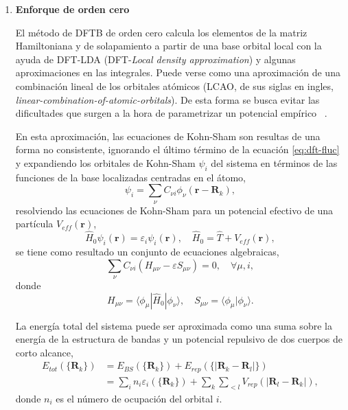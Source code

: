 \begin{enumerate}
    \item \textbf{Enforque de orden cero}

        El método de DFTB de orden cero calcula los elementos de la matriz 
        Hamiltoniana y de solapamiento a partir de una base orbital local con la
        ayuda de DFT-LDA (DFT-\textit{Local density approximation}) y algunas
        aproximaciones en las integrales. Puede verse como una aproximación de 
        una combinación lineal de los orbitales atómicos (LCAO, de sus siglas en 
        ingles, \textit{linear-combination-of-atomic-orbitals}). De esta forma se
        busca evitar las dificultades que surgen a la hora de parametrizar un 
        potencial empírico ~\cite{dftb1, dftb2}.

        En esta aproximación, las ecuaciones de Kohn-Sham son resultas de una
        forma no consistente, ignorando el último término de la ecuación 
        \ref{eq:dft-fluc} y expandiendo los orbitales de Kohn-Sham $\psi_i$ del 
        sistema en términos de las funciones de la base localizadas centradas en 
        el átomo,
        $$
        \psi_i = \sum_{\nu} C_{\nu i} \phi_{\nu}(\mathbf{r}-\mathbf{R}_k),
        $$
        resolviendo las ecuaciones de Kohn-Sham para un potencial efectivo de una
        partícula $V_{eff}(\mathbf{r})$,
        \begin{equation}\label{eq:kohn-sham-mod}
            \hat{H}_0 \psi_i(\mathbf{r}) = \varepsilon_i \psi_i(\mathbf{r}), \quad \hat{H}_0 = \hat{T} + V_{eff}(\mathbf{r}),
        \end{equation}
        se tiene como resultado un conjunto de ecuaciones algebraicas,
        \begin{equation}\label{eq:alg-eq}
        \sum_{\nu} C_{\nu i} (H_{\mu \nu} - \varepsilon S_{\mu \nu}) = 0, \quad \forall \mu, i,
        \end{equation}
        donde
        $$
        H_{\mu \nu} = \langle \phi_{\mu}|\hat{H}_0|\phi_{\nu} \rangle, \quad S_{\mu \nu} = \langle\phi_{\mu}|\phi_{\nu}\rangle.
        $$

        La energía total del sistema puede ser aproximada como una suma sobre la
        energía de la estructura de bandas y un potencial repulsivo de dos cuerpos
        de corto alcance,
        \begin{equation*}
            \begin{aligned}
                   E_{tot}(\{\mathbf{R}_k\}) &= E_{BS}(\{\mathbf{R}_k\}) + E_{rep}(\{|\mathbf{R}_k - \mathbf{R}_l|\}) \\
                    &= \sum_i n_i \varepsilon_i(\{\mathbf{R}_k\}) + \sum_k \sum_{<l} V_{rep}(|\mathbf{R}_l - \mathbf{R}_k|),
            \end{aligned}
        \end{equation*}
        donde $n_i$ es el número de ocupación del orbital $i$.
        

\end{enumerate}
